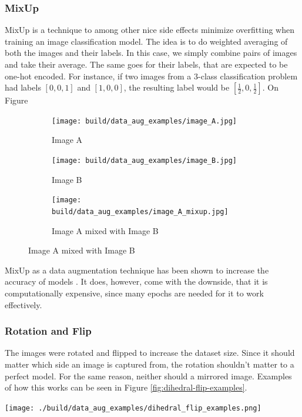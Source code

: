 \subsubsection{MixUp} \label{sec:mixup}
MixUp is a technique to among other nice side effects minimize overfitting when training 
an image classification model.
The idea is to do weighted averaging of both the images and their labels.
In this case, we simply combine pairs of images and take their average.
The same goes for their labels, that are expected to be one-hot encoded.
For instance, if two images from a $3$-class classification problem had labels $[0,0,1]$ and $[1,0,0]$,
the resulting label would be $[\frac12,0,\frac12]$.
On Figure 
\begin{figure}
    \begin{subfigure}{0.3\textwidth}
        \texttt{[image: build/data\_aug\_examples/image\_A.jpg]}
        \caption{Image A}
        \label{fig:image-A}
    \end{subfigure}
    \begin{subfigure}{0.3\textwidth}
        \texttt{[image: build/data\_aug\_examples/image\_B.jpg]}
        \caption{Image B}
    \end{subfigure}
    \begin{subfigure}{0.3\textwidth}
        \texttt{[image: build/data\_aug\_examples/image\_A\_mixup.jpg]}
        \caption{Image A mixed with Image B}
    \end{subfigure}
    \label{fig:mixup-example}
\end{figure}

MixUp as a data augmentation technique has been shown to increase the accuracy of models \cite{mixup-paper}.
It does, however, come with the downside, that it is computationally expensive,
since many epochs are needed for it to work effectively.

\subsubsection{Rotation and Flip}
The images were rotated and flipped to increase the dataset size.
Since it should matter which side an image is captured from, 
the rotation shouldn't matter to a perfect model.
For the same reason, neither should a mirrored image.
Examples of how this works can be seen in Figure \ref{fig:dihedral-flip-examples}.
\begin{center}
    \texttt{[image: ./build/data\_aug\_examples/dihedral\_flip\_examples.png]}
    \label{fig:dihedral-flip-examples}
\end{center}

